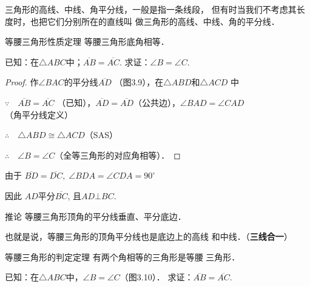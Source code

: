 三角形的高线、中线、角平分线，一般是指一条线段，
但有时当我们不考虑其长度时，也把它们分别所在的直线叫
做三角形的高线、中线、角的平分线．


\begin{blk}
    {等腰三角形性质定理} 等腰三角形底角相等．
\end{blk}

已知：在$\triangle ABC$中；$\overline{AB}=\overline{AC}$.
求证：$\angle B=\angle C$.

\begin{figure}[htp]
    \centering
{}
    \caption{}
\end{figure}
\begin{proof}
    作$\angle BAC$的平分线$\overline{AD}$
（图3.9），在$\triangle ABD$和$\triangle ACD$
中

$\because\quad \overline{AB}=\overline{AC}$ （已知），$\overline{AD}=\overline{AD}$（公共边），$\angle BAD=\angle CAD$（角平分线定义）

$\therefore\quad \triangle ABD\cong\triangle ACD$（SAS）

$\therefore\quad \angle B=\angle C$（全等三角形的对应角相等）．
\end{proof}


由于 $\overline{BD}=\overline{DC},\; \angle BDA=\angle CDA=90^{\circ}$

因此 $AD$平分$\overline{BC}$, 且$AD\bot BC$.

\begin{blk}{推论 }
    等腰三角形顶角的平分线垂直、平分底边．
\end{blk}

也就是说，等腰三角形的顶角平分线也是底边上的高线
和中线．（\textbf{三线合一}）

\begin{blk}
    {等腰三角形的判定定理} 有两个角相等的三角形是等腰
三角形．
\end{blk}

已知：在$\triangle ABC$中，$\angle B=\angle C$（图3.10）．
求证：$\overline{AB}=\overline{AC}$.

\begin{figure}[htp]
    \centering
{}
    \caption{}
\end{figure}


